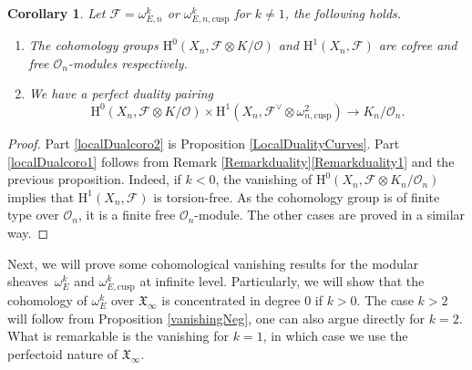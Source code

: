 \documentclass[11pt]{article}
\newcommand{\cusp}{\mathrm{cusp}}
\numberwithin{equation}{section}
\newtheorem{cor}[prop]{Corollary}
\theoremstyle{definition}
\newcommand{\n}[1]{\mathcal{#1}}
\newcommand{\f}[1]{\mathfrak{#1}}
\begin{document}
\begin{cor}
\label{localDualcoro}
Let $\n{F}=\omega^k_{E,n}$ or $\omega^k_{E,n,\cusp}$ for $k\neq 1$, the following holds.
\begin{enumerate}
\item\label{localDualcoro1} The cohomology groups $\mathrm{H}^0(X_n, \n{F}\otimes K/\n{O})$ and $\mathrm{H}^1(X_n, \n{F})$ are cofree and free $\n{O}_n$-modules respectively.

\item\label{localDualcoro2} We have a perfect duality pairing
\[
\mathrm{H}^0(X_n, \n{F}\otimes K/\n{O})\times \mathrm{H}^1(X_n, \n{F}^\vee \otimes \omega^2_{n,\cusp})\to K_n/\n{O}_n.
\]
\end{enumerate}
\end{cor}

\begin{proof}
Part \eqref{localDualcoro2} is Proposition \ref{LocalDualityCurves}. Part \eqref{localDualcoro1} follows from Remark \ref{Remarkduality}\eqref{Remarkduality1} and the previous proposition. Indeed, if $k<0$, the vanishing of $\mathrm{H}^0(X_n, \n{F}\otimes K_n/\n{O}_n)$ implies that $\mathrm{H}^1(X_n, \n{F})$ is torsion-free. As the cohomology group is of finite type over $\n{O}_n$, it is a finite free $\n{O}_n$-module. The other cases are proved in a similar way.
\end{proof}

Next, we will prove some cohomological vanishing results for the modular sheaves~$\omega_E^k$ and $\omega^k_{E,\cusp}$ at infinite level. Particularly, we will show that the cohomology of $\omega_E^k$ over $\f{X}_{\infty}$ is concentrated in degree $0$ if $k>0$. The case $k> 2$ will follow from Proposition \ref{vanishingNeg}, one can also argue directly for $k=2$. What is remarkable is the vanishing for $k=1$, in which case we use the perfectoid nature of $\f{X}_{\infty}$.
\end{document}

